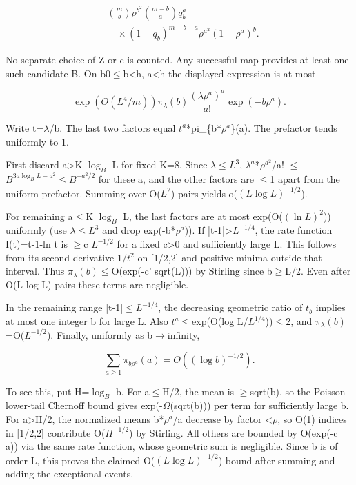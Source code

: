 \documentclass[11pt]{article}
\begin{document}
\[
\begin{aligned}&\binom mb\rho^{b^2}\binom{m-b}{a}q_b^a\\
&\quad{}\times(1-q_b)^{m-b-a}\rho^{a^2}(1-\rho^a)^b.\end{aligned}
\]

No separate choice of Z or c is counted. Any successful map provides at least one such candidate B. On b0\ensuremath{\leq}b<h, a<h the displayed expression is at most

\[
\exp(O(L^4/m))\pi_\lambda(b)\frac{(\lambda\rho^a)^a}{a!}\exp(-b\rho^a).
\]

Write t=$\lambda$/b. The last two factors equal $t^{a}$*pi\_\{b*$\rho^{a}$\}(a). The prefactor tends uniformly to 1.

First discard a>K $\log_B$ L for fixed K=8. Since $\lambda$\ensuremath{\leq}$L^{3}$, $\lambda^{a}$*$\rho^{a^2}$/a! \ensuremath{\leq} $B^{3a\log_B L-a^2}$\ensuremath{\leq}$B^{-a^2/2}$ for these a, and the other factors are \ensuremath{\leq}1 apart from the uniform prefactor. Summing over O($L^{2}$) pairs yields o($(L\log L)^{-1/2}$).

For remaining a\ensuremath{\leq}K $\log_B$ L, the last factors are at most exp(O($(\ln L)^2$)) uniformly (use $\lambda$\ensuremath{\leq}$L^{3}$ and drop exp(-b*$\rho^{a}$)). If |t-1|>$L^{-1/4}$, the rate function I(t)=t-1-ln t is \ensuremath{\geq}c $L^{-1/2}$ for a fixed c>0 and sufficiently large L. This follows from its second derivative 1/$t^{2}$ on [1/2,2] and positive minima outside that interval. Thus $\pi_\lambda(b)$\ensuremath{\leq}O(exp(-c' sqrt(L))) by Stirling since b\ensuremath{\geq}L/2. Even after O(L log L) pairs these terms are negligible.

In the remaining range |t-1|\ensuremath{\leq}$L^{-1/4}$, the decreasing geometric ratio of $t_{b}$ implies at most one integer b for large L. Also $t^{a}$\ensuremath{\leq}exp(O(log L/$L^{1/4}$))\ensuremath{\leq}2, and $\pi_\lambda(b)$=O($L^{-1/2}$). Finally, uniformly as b\ensuremath{\to}infinity,

\[
\sum_{a\geq1}\pi_{b\rho^a}(a)=O((\log b)^{-1/2}).
\]

To see this, put H=$\log_B$ b. For a\ensuremath{\leq}H/2, the mean is \ensuremath{\geq}sqrt(b), so the Poisson lower-tail Chernoff bound gives exp(-$\Omega$(sqrt(b))) per term for sufficiently large b. For a>H/2, the normalized means b*$\rho^{a}$/a decrease by factor <$\rho$, so O(1) indices in [1/2,2] contribute O($H^{-1/2}$) by Stirling. All others are bounded by O(exp(-c a)) via the same rate function, whose geometric sum is negligible. Since b is of order L, this proves the claimed O($(L\log L)^{-1/2}$) bound after summing and adding the exceptional events.
\end{document}

